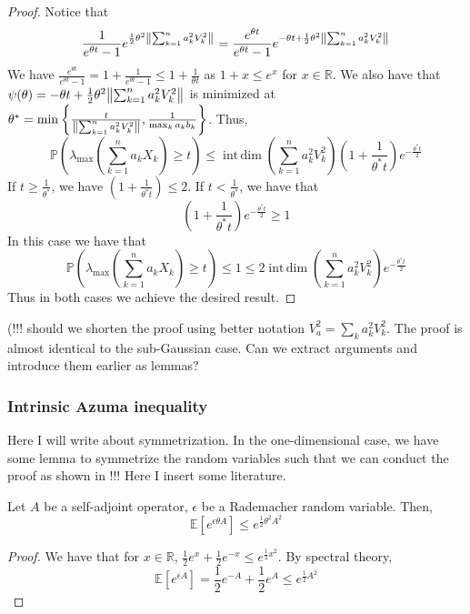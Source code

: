 \begin{proof}
    Notice that 
    \[ \frac{1}{e^{\theta t}-1} e^{\frac{1}{2} \theta^{2} \norm{\sum_{k=1}^{n}a_k^{2}V_k^{2}}_{}} = \frac{e^{\theta t}}{e^{\theta t}-1} e^{-\theta t+ \frac{1}{2}\theta^{2} \norm{\sum_{k=1}^{n}a_k^{2}V_k^{2}}_{}} \]
    We have \( \frac{e^{\theta t}}{e^{\theta t }-1}=1+ \frac{1}{e^{\theta t}-1} \leq 1+ \frac{1}{\theta t} \) as \( 1+x \leq e^{x} \) for \( x \in \mathbb{R} \). We also have that \( \psi(\theta) = - \theta t + \frac{1}{2} \theta^{2} \norm{\sum_{k=1}^{n}a_k^{2}V_k^{2}}_{} \) is minimized at \(\theta^{*}= \min_{} \left\{\frac{t}{\norm{\sum_{k=1}^{n}a_k^{2}V_k^{2}}}, \frac{1}{\max_{k}a_kb_k} \right\} \). 
    Thus,
    \[ \mathbb{P}(\lambda_{\text{max}} (\sum_{k=1}^{n}a_kX_k) \geq t) \leq \operatorname{int\, dim}\left(\sum_{k=1}^{n} a_k^{2}V_k^{2}\right) \left(1+ \frac{1}{\theta^{*}t}\right) e^{-\frac{\theta^{*}t}{2}} \]
    If  \( t \geq \frac{1}{\theta^{*}}\), we have \( \left(1+\frac{1}{\theta^{*}t}\right) \leq 2 \). If \( t < \frac{1}{\theta^{*}} \), we have that 
    \[ \left(1+\frac{1}{\theta^{*}t}\right) e^{-\frac{\theta^{*}t}{2}} \geq 1 \]
    In this case we have that 
    \[ \mathbb{P}(\lambda_{\text{max}} (\sum_{k=1}^{n}a_kX_k) \geq t) \leq 1 \leq 2 \operatorname{int\, dim}\left(\sum_{k=1}^{n}a_k^{2}V_k^{2}\right) e^{- \frac{\theta^{*}t}{2}} \]
    Thus in both cases we achieve the desired result.
\end{proof}
(!!! should we shorten the proof using better notation \( V_a^{2}= \sum_{k}^{}a_k^{2}V_k^{2} \). The proof is almost identical to the sub-Gaussian case. Can we extract arguments and introduce them earlier as lemmas?


\subsubsection{Intrinsic Azuma inequality}
Here I will write about symmetrization.
In the one-dimensional case, we have some lemma to symmetrize the random variables such that we can conduct the proof as shown in !!! Here I insert some literature.

\begin{lem}
    Let \( A \) be a self-adjoint operator, \( \epsilon \) be a Rademacher random variable. Then,
    \[ \mathbb{E}\left[e^{\epsilon \theta A}\right] \leq  e^{\frac{1}{2}\theta^{2} A^{2}} \]
\end{lem}

\begin{proof}
    We have that for \( x \in \mathbb{R} \), \( \frac{1}{2}e^{x} + \frac{1}{2}e^{-x} \leq e^{\frac{1}{2}x^{2}} \). By spectral theory,
    \[ \mathbb{E}\left[e^{\epsilon A}\right] = \frac{1}{2}e^{-A} + \frac{1}{2}e^{A} \leq e^{\frac{1}{2}A^{2}} \]
\end{proof}

